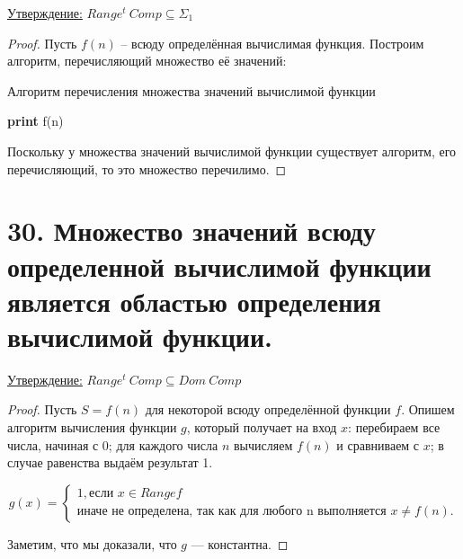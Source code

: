 \documentclass[a4paper, 12pt]{article}
\newcommand{\statement}{\underline{Утверждение:} }
\begin{document}
\statement{$Range^t\ Comp \subseteq \Sigma_1$}
        
        \begin{proof}
            Пусть $f(n)$ -- всюду определённая вычислимая функция. Построим алгоритм, перечисляющий множество её значений:
            
            \begin{algorithm}
            \caption{Алгоритм перечисления множества значений вычислимой функции}
            \begin{algorithmic}[1]
                    \State \textbf{print} f(n)
                \EndFor
            \EndFunction
            \end{algorithmic}
            \end{algorithm}
            
            Поскольку у множества значений вычислимой функции существует алгоритм, его перечисляющий, то это множество перечилимо.
            
        \end{proof}

\section*{30. Множество значений всюду определенной вычислимой функции является областью определения вычислимой функции.}

\statement{$Range^t\ Comp \subseteq Dom\ Comp$}
        
        \begin{proof}
            Пусть $S = f(n)$ для некоторой всюду определённой функции $f$. Опишем алгоритм вычисления функции $g$, который получает на вход $x$: перебираем все числа, начиная с 0; для каждого числа $n$ вычисляем $f(n)$ и сравниваем с $x$; в случае равенства выдаём результат 1.
            
             \[
                g(x) =
                \begin{cases}
                    1, \text{если $x \in Rangef$} \\
                    \text{иначе не определена, так как для любого n выполняется $x \neq f(n)$}.
                \end{cases}
            \]
            
        Заметим, что мы доказали, что $g$ --- константна.
        \end{proof}
\end{document}
